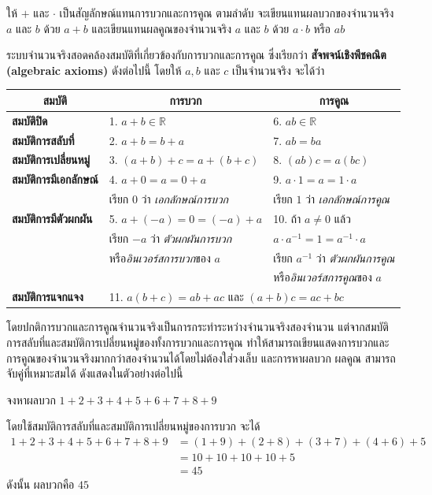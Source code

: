 ให้ $+$ และ $\cdot$ เป็นสัญลักษณ์แทนการบวกและการคูณ ตามลำดับ จะเขียนแทนผลบวกของจำนวนจริง $a$ และ $b$ ด้วย $a + b$ และเขียนแทนผลคูณของจำนวนจริง $a$ และ $b$ ด้วย $a \cdot b$ หรือ $a b$

ระบบจำนวนจริงสอดคล้องสมบัติที่เกี่ยวข้องกับการบวกและการคูณ ซึ่งเรียกว่า \textbf{สัจพจน์เชิงพีชคณิต (algebraic axioms)} ดังต่อไปนี้ โดยให้ $a, b$ และ $c$ เป็นจำนวนจริง จะได้ว่า

\begin{center}
	\renewcommand{\arraystretch}{1.6} 
	\begin{tabular}{|l|l|l|}
		\hline
		\multicolumn{1}{|c|}{\textbf{สมบัติ}} & \multicolumn{1}{c|}{\textbf{การบวก}} & \multicolumn{1}{c|}{\textbf{การคูณ}} \\ \hline
		\textbf{สมบัติปิด} & 1. $a+b \in \mathbb{R}$ & 6. $ab \in \mathbb{R}$ \\ \hline
		\textbf{สมบัติการสลับที่} & 2. $a+b = b+a$ & 7. $ab = ba$ \\ \hline
		\textbf{สมบัติการเปลี่ยนหมู่} & 3. $(a+b)+c = a+(b+c)$ & 8. $(ab)c = a(bc)$ \\ \hline
		\textbf{สมบัติการมีเอกลักษณ์} & 4. $a+0 = a = 0+a$ & 9. $a \cdot 1 = a = 1 \cdot a$ \\
		& เรียก $0$ ว่า \textit{เอกลักษณ์การบวก} & เรียก $1$ ว่า \textit{เอกลักษณ์การคูณ} \\ \hline
		\textbf{สมบัติการมีตัวผกผัน} & 5. $a+(-a) = 0 = (-a)+a$ & 10. ถ้า $a \neq 0$ แล้ว \\
		& เรียก $-a$ ว่า \textit{ตัวผกผันการบวก} & \qquad $a \cdot a^{-1} = 1 = a^{-1} \cdot a$ \\
		& หรือ\textit{อินเวอร์สการบวก}ของ $a$ & เรียก $a^{-1}$ ว่า \textit{ตัวผกผันการคูณ} \\
		& & หรือ\textit{อินเวอร์สการคูณ}ของ $a$ \\ \hline
		\textbf{สมบัติการแจกแจง} & \multicolumn{2}{l|}{11. $a(b+c) = ab+ac$ และ $(a+b)c = ac+bc$} \\ \hline
	\end{tabular}
\end{center}

โดยปกติการบวกและการคูณจำนวนจริงเป็นการกระทำระหว่างจำนวนจริงสองจำนวน แต่จากสมบัติการสลับที่และสมบัติการเปลี่ยนหมู่ของทั้งการบวกและการคูณ ทำให้สามารถเขียนแสดงการบวกและการคูณของจำนวนจริงมากกว่าสองจำนวนได้โดยไม่ต้องใส่วงเล็บ และการหาผลบวก ผลคูณ สามารถจับคู่ที่เหมาะสมได้ ดังแสดงในตัวอย่างต่อไปนี้

\newpage
\begin{examplebox}
จงหาผลบวก $1+2+3+4+5+6+7+8+9$
\end{examplebox}
\solution โดยใช้สมบัติการสลับที่และสมบัติการเปลี่ยนหมู่ของการบวก จะได้
\begin{align*}
	1+2+3+4+5+6+7+8+9 &= (1+9)+(2+8)+(3+7)+(4+6)+5 \\
	&= 10+10+10+10+5 \\
	&= 45
\end{align*}
ดังนั้น ผลบวกคือ $45$

